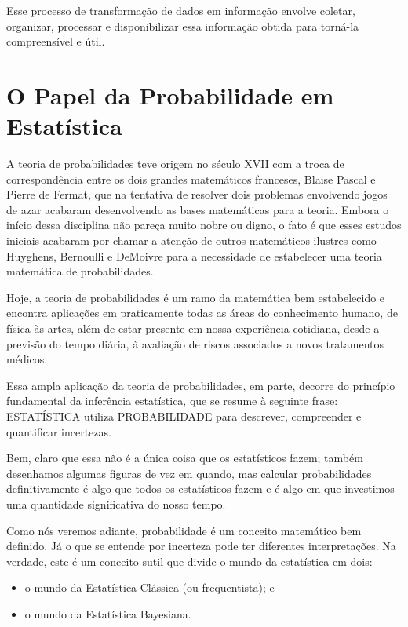 \documentclass[
]{book}
\theoremstyle{definition}
\theoremstyle{definition}
\theoremstyle{definition}
\theoremstyle{remark}
\begin{document}
Esse processo de transformação de dados em informação envolve coletar, organizar, processar e disponibilizar essa informação obtida para torná-la compreensível e útil.

\hypertarget{o-papel-da-probabilidade-em-estatuxedstica}{%
\section{O Papel da Probabilidade em Estatística}\label{o-papel-da-probabilidade-em-estatuxedstica}}

A teoria de probabilidades teve origem no século XVII com a troca de correspondência entre os dois grandes matemáticos franceses, Blaise Pascal e Pierre de Fermat, que na tentativa de resolver dois problemas envolvendo jogos de azar acabaram desenvolvendo as bases matemáticas para a teoria. Embora o início dessa disciplina não pareça muito nobre ou digno, o fato é que esses estudos iniciais acabaram por chamar a atenção de outros matemáticos ilustres como Huyghens, Bernoulli e DeMoivre para a necessidade de estabelecer uma teoria matemática de probabilidades.

Hoje, a teoria de probabilidades é um ramo da matemática bem estabelecido e encontra aplicações em praticamente todas as áreas do conhecimento humano, de física às artes, além de estar presente em nossa experiência cotidiana, desde a previsão do tempo diária, à avaliação de riscos associados a novos tratamentos médicos.

Essa ampla aplicação da teoria de probabilidades, em parte, decorre do princípio fundamental da inferência estatística, que se resume à seguinte frase: ESTATÍSTICA utiliza PROBABILIDADE para descrever, compreender e quantificar incertezas.

Bem, claro que essa não é a única coisa que os estatísticos fazem; também desenhamos algumas figuras de vez em quando, mas calcular probabilidades definitivamente é algo que todos os estatísticos fazem e é algo em que investimos uma quantidade significativa do nosso tempo.

Como nós veremos adiante, probabilidade é um conceito matemático bem definido. Já o que se entende por incerteza pode ter diferentes interpretações. Na verdade, este é um conceito sutil que divide o mundo da estatística em dois:

\begin{itemize}
\item
  o mundo da Estatística Clássica (ou frequentista); e
\item
  o mundo da Estatística Bayesiana.
\end{itemize}
\end{document}
